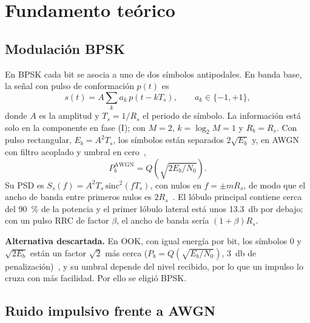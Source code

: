 \section{Fundamento teórico}\label{sec:fundamento}

\subsection{Modulación BPSK}\label{subsec:bpsk}

En BPSK cada bit se asocia a uno de dos símbolos antipodales. En banda base, la
señal con pulso de conformación $p(t)$ es
\begin{equation}
  s(t)=A\sum_{k} a_k\,p(t-kT_s), \qquad a_k\in\{-1,+1\},
  \label{eq:bpsk}
\end{equation}
donde $A$ es la amplitud y $T_s=1/R_s$ el periodo de símbolo. La información
está solo en la componente en fase (I); con $M=2$, $k=\log_2M=1$ y $R_b=R_s$.
Con pulso rectangular, $E_b=A^2T_s$, los símbolos están separados $2\sqrt{E_b}$
y, en AWGN con filtro acoplado y umbral en cero~\cite{proakis2008},
\begin{equation}
  P_b^{\mathrm{AWGN}}=Q\!\left(\sqrt{2E_b/N_0}\right).
  \label{eq:pb_awgn}
\end{equation}
Su PSD es $S_s(f)=A^2T_s\,\mathrm{sinc}^2(fT_s)$, con nulos en $f=\pm mR_s$, de
modo que el ancho de banda entre primeros nulos es $2R_s$~\cite{sklar2001}. El
lóbulo principal contiene cerca del \SI{90}{\percent} de la potencia y el primer
lóbulo lateral está unos \SI{13,3}{\decibel} por debajo; con un pulso RRC de
factor $\beta$, el ancho de banda sería $(1+\beta)R_s$.

\textbf{Alternativa descartada.} En OOK, con igual energía por bit, los símbolos
$0$ y $\sqrt{2E_b}$ están un factor $\sqrt2$ más cerca
($P_b=Q(\sqrt{E_b/N_0})$, \SI{3}{\decibel} de penalización)~\cite{proakis2008}, y
su umbral depende del nivel recibido, por lo que un impulso lo cruza con más
facilidad. Por ello se eligió BPSK.

\subsection{Ruido impulsivo frente a AWGN}\label{subsec:ruido}


